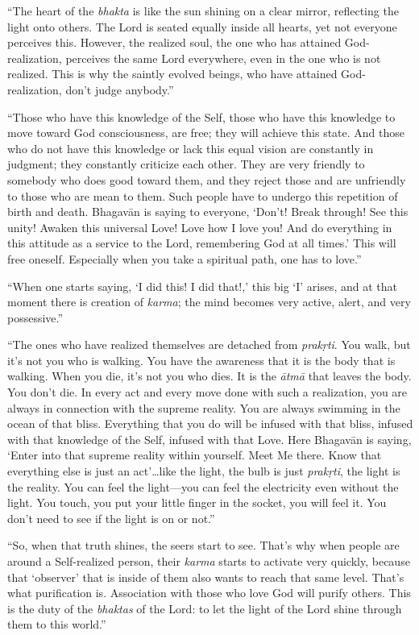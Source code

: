 \enquote{The heart of the \textit{bhakta} is like the sun shining on a clear mirror, reflecting the light onto others. The Lord is seated equally inside all hearts, yet not everyone perceives this. However, the realized soul, the one who has attained God-realization, perceives the same Lord everywhere, even in the one who is not realized. This is why the saintly evolved beings, who have attained God-realization, don’t judge anybody.}

\enquote{Those who have this knowledge of the Self, those who have this knowledge to move toward God consciousness, are free; they will achieve this state. And those who do not have this knowledge or lack this equal vision are constantly in judgment; they constantly criticize each other. They are very friendly to somebody who does good toward them, and they reject those and are unfriendly to those who are mean to them. Such people have to undergo this repetition of birth and death. Bhagavān is saying to everyone, \enquote{Don’t! Break through! See this unity! Awaken this universal Love! Love how I love you! And do everything in this attitude as a service to the Lord, remembering God at all times.} This will free oneself. Especially when you take a spiritual path, one has to love.}

\enquote{When one starts saying, \enquote{I did this! I did that!,} this big \enquote{I} arises, and at that moment there is creation of \textit{karma}; the mind becomes very active, alert, and very possessive.}

\enquote{The ones who have realized themselves are detached from \textit{prakṛti}. You walk, but it’s not you who is walking. You have the awareness that it is the body that is walking. When you die, it’s not you who dies. It is the \textit{ātmā} that leaves the body. You don’t die. In every act and every move done with such a realization, you are always in connection with the supreme reality. You are always swimming in the ocean of that bliss. Everything that you do will be infused with that bliss, infused with that knowledge of the Self, infused with that Love. Here Bhagavān is saying, \enquote{Enter into that supreme reality within yourself. Meet Me there. Know that everything else is just an act}\ldots like the light, the bulb is just \textit{prakṛti}, the light is the reality. You can feel the light---you can feel the electricity even without the light. You touch, you put your little finger in the socket, you will feel it. You don’t need to see if the light is on or not.}

\enquote{So, when that truth shines, the seers start to see. That’s why when people are around a Self-realized person, their \textit{karma} starts to activate very quickly, because that \enquote{observer} that is inside of them also wants to reach that same level. That’s what purification is. Association with those who love God will purify others. This is the duty of the \textit{bhaktas} of the Lord: to let the light of the Lord shine through them to this world.}